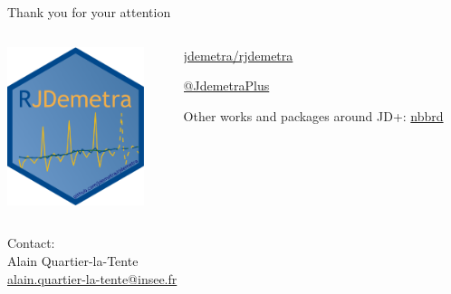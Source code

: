 \documentclass[10pt,xcolor=table,color={dvipsnames,usenames},ignorenonframetext,usepdftitle=false,french]{beamer}
\begin{document}
\begin{frame}{Thank you for your attention}
\protect\hypertarget{thank-you-for-your-attention}{}

\vspace{-0.2cm}

\begin{columns}
\begin{column}{0.4\textwidth}
\begin{center}
\includegraphics[width=4cm]{img/rjdemetra_logo.png}
\end{center}
\end{column}
\begin{column}{0.5\textwidth} 
\href{https://github.com/jdemetra/rjdemetra}{\faGithub{} jdemetra/rjdemetra}  

\href{https://twitter.com/JDemetraPlus}{\faTwitter{} @JdemetraPlus}

Other works and packages around JD+:  
\href{https://github.com/nbbrd}{\faGithub{} nbbrd}  
\end{column}
\end{columns}

\vfill

Contact:\\
Alain Quartier-la-Tente\\
\href{mailto:alain.quartier-la-tente@insee.fr}{\faEnvelope{} alain.quartier-la-tente@insee.fr}

\end{frame}
\end{document}
